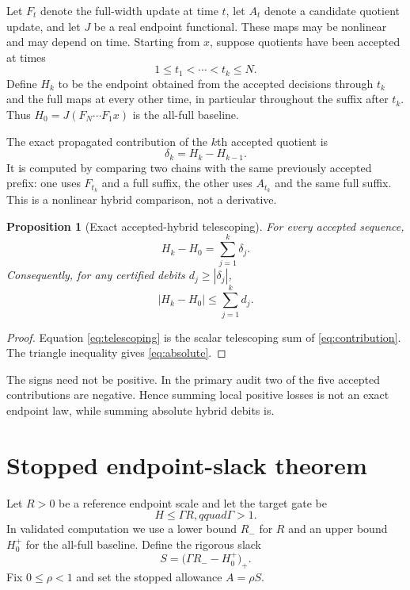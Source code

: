 \documentclass[11pt]{article}
\newtheorem{proposition}[theorem]{Proposition}
\theoremstyle{definition}
\theoremstyle{remark}
\begin{document}
Let $F_t$ denote the full-width update at time $t$, let $A_t$ denote a
candidate quotient update, and let $J$ be a real endpoint functional.  These
maps may be nonlinear and may depend on time.  Starting from $x$, suppose
quotients have been accepted at times
\[
 1\le t_1<\cdots<t_k\le N.
\]
Define $H_k$ to be the endpoint obtained from the accepted decisions through
$t_k$ and the full maps at every other time, in particular throughout the
suffix after $t_k$.  Thus $H_0=J(F_N\cdots F_1x)$ is the all-full baseline.

The exact propagated contribution of the $k$th accepted quotient is
\begin{equation}
 \delta_k=H_k-H_{k-1}.
 \label{eq:contribution}
\end{equation}
It is computed by comparing two chains with the same previously accepted
prefix: one uses $F_{t_k}$ and a full suffix, the other uses $A_{t_k}$ and the
same full suffix.  This is a nonlinear hybrid comparison, not a derivative.

\begin{proposition}[Exact accepted-hybrid telescoping]
\label{prop:telescoping}
For every accepted sequence,
\begin{equation}
 H_k-H_0=\sum_{j=1}^k\delta_j.
 \label{eq:telescoping}
\end{equation}
Consequently, for any certified debits $d_j\ge|\delta_j|$,
\begin{equation}
 |H_k-H_0|\le\sum_{j=1}^kd_j.
 \label{eq:absolute}
\end{equation}
\end{proposition}

\begin{proof}
Equation \eqref{eq:telescoping} is the scalar telescoping sum of
\eqref{eq:contribution}.  The triangle inequality gives
\eqref{eq:absolute}.
\end{proof}

The signs need not be positive.  In the primary audit two of the five
accepted contributions are negative.  Hence summing local positive losses is
not an exact endpoint law, while summing absolute hybrid debits is.

\section{Stopped endpoint-slack theorem}
\label{sec:clock}

Let $R>0$ be a reference endpoint scale and let the target gate be
\begin{equation}
 H\le\Gamma R,qquad \Gamma>1.
 \label{eq:gate}
\end{equation}
In validated computation we use a lower bound $R_-$ for $R$ and an upper
bound $H_0^+$ for the all-full baseline.  Define the rigorous slack
\begin{equation}
 S=\bigl(\Gamma R_--H_0^+\bigr)_+.
 \label{eq:slack}
\end{equation}
Fix $0\le\rho<1$ and set the stopped allowance $A=\rho S$.
\end{document}
